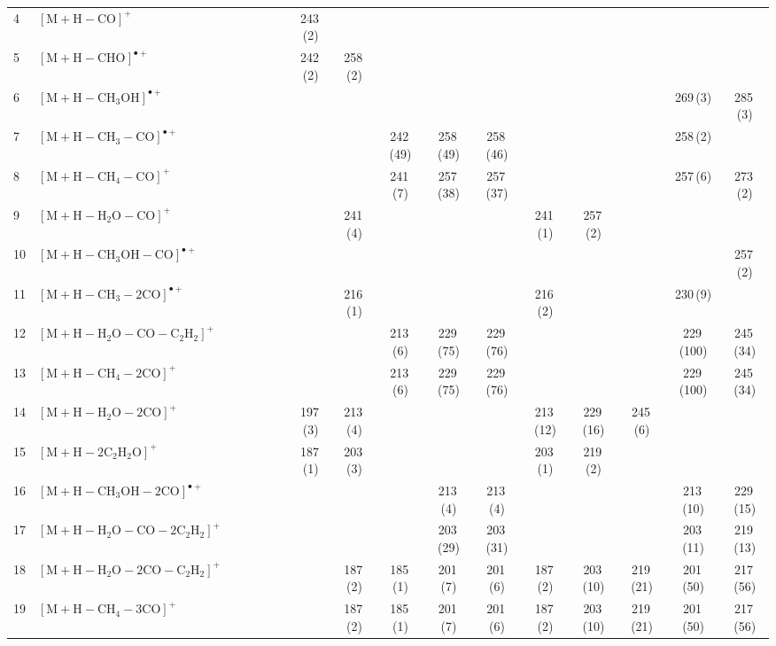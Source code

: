 \documentclass[]{article}
\begin{document}
\begin{table}
{\begin{tabular}{ll|ccccc|ccccc|ccccc}
  4 & $\mathrm{[M{+}H{-}CO]^+}$ &  &  &  &  &  & 243\,(2) &  &  &  &  &  &  &  &  &  \\ 
  5 & $\mathrm{[M{+}H{-}CHO]^{\bullet+}}$ &  &  &  &  &  & 242\,(2) & 258\,(2) &  &  &  &  &  &  &  &  \\ 
  6 & $\mathrm{[M{+}H{-}CH_{3}OH]^{\bullet+}}$ &  &  &  &  &  &  &  &  &  &  &  &  &  & 269\,(3) & 285\,(3) \\ 
  7 & $\mathrm{[M{+}H{-}CH_{3}{-}CO]^{\bullet+}}$ &  &  &  &  &  &  &  & 242\,(49) & 258\,(49) & 258\,(46) &  &  &  & 258\,(2) &  \\ 
  8 & $\mathrm{[M{+}H{-}CH_{4}{-}CO]^+}$ &  &  &  &  &  &  &  & 241\,(7) & 257\,(38) & 257\,(37) &  &  &  & 257\,(6) & 273\,(2) \\ 
  9 & $\mathrm{[M{+}H{-}H_{2}O{-}CO]^+}$ &  &  &  &  &  &  & 241\,(4) &  &  &  & 241\,(1) & 257\,(2) &  &  &  \\ 
  10 & $\mathrm{[M{+}H{-}CH_{3}OH{-}CO]^{\bullet+}}$ &  &  &  &  &  &  &  &  &  &  &  &  &  &  & 257\,(2) \\ 
  11 & $\mathrm{[M{+}H{-}CH_{3}{-}2CO]^{\bullet+}}$ &  &  &  &  &  &  & 216\,(1) &  &  &  & 216\,(2) &  &  & 230\,(9) &  \\ 
  12 & $\mathrm{[M{+}H{-}H_{2}O{-}CO{-}C_{2}H_{2}]^+}$ &  &  &  &  &  &  &  & 213\,(6) & 229\,(75) & 229\,(76) &  &  &  & 229\,(100) & 245\,(34) \\ 
  13 & $\mathrm{[M{+}H{-}CH_{4}{-}2CO]^+}$ &  &  &  &  &  &  &  & 213\,(6) & 229\,(75) & 229\,(76) &  &  &  & 229\,(100) & 245\,(34) \\ 
  14 & $\mathrm{[M{+}H{-}H_{2}O{-}2CO]^+}$ &  &  &  &  &  & 197\,(3) & 213\,(4) &  &  &  & 213\,(12) & 229\,(16) & 245\,(6) &  &  \\ 
  15 & $\mathrm{[M{+}H{-}2C_{2}H_{2}O]^+}$ &  &  &  &  &  & 187\,(1) & 203\,(3) &  &  &  & 203\,(1) & 219\,(2) &  &  &  \\ 
  16 & $\mathrm{[M{+}H{-}CH_{3}OH{-}2CO]^{\bullet+}}$ &  &  &  &  &  &  &  &  & 213\,(4) & 213\,(4) &  &  &  & 213\,(10) & 229\,(15) \\ 
  17 & $\mathrm{[M{+}H{-}H_{2}O{-}CO{-}2C_{2}H_{2}]^+}$ &  &  &  &  &  &  &  &  & 203\,(29) & 203\,(31) &  &  &  & 203\,(11) & 219\,(13) \\ 
  18 & $\mathrm{[M{+}H{-}H_{2}O{-}2CO{-}C_{2}H_{2}]^+}$ &  &  &  &  &  &  & 187\,(2) & 185\,(1) & 201\,(7) & 201\,(6) & 187\,(2) & 203\,(10) & 219\,(21) & 201\,(50) & 217\,(56) \\ 
  19 & $\mathrm{[M{+}H{-}CH_{4}{-}3CO]^+}$ &  &  &  &  &  &  & 187\,(2) & 185\,(1) & 201\,(7) & 201\,(6) & 187\,(2) & 203\,(10) & 219\,(21) & 201\,(50) & 217\,(56) \\ 

\end{tabular}}
\end{table}
\end{document}
